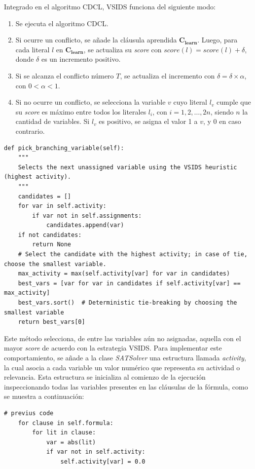 Integrado en el algoritmo CDCL, VSIDS funciona del siguiente modo:

\begin{enumerate}
    \item Se ejecuta el algoritmo CDCL.
    \item Si ocurre un conflicto, se añade la cláusula aprendida \(\mathbf{C_{learn}}\). Luego, para cada literal \( l \) en \(\mathbf{C_{learn}}\), se actualiza su \textit{score} con \(score(l) = score(l) + \delta\), donde \(\delta\) es un incremento positivo.
    \item Si se alcanza el conflicto número \( T \), se actualiza el incremento con \( \delta = \delta \times \alpha \), con \(0 < \alpha < 1\).
    \item Si no ocurre un conflicto, se selecciona la variable \( v \) cuyo literal \( l_v \) cumple que su \textit{score} es máximo entre todos los literales \( l_i \), con \( i = 1, 2, \ldots, 2n \), siendo \( n \) la cantidad de variables. Si \( l_v \) es positivo, se asigna el valor 1 a \( v \), y 0 en caso contrario.
\end{enumerate}

\begin{lstlisting}
def pick_branching_variable(self):
    """
    Selects the next unassigned variable using the VSIDS heuristic (highest activity).
    """
    candidates = []
    for var in self.activity:
        if var not in self.assignments:
            candidates.append(var)
    if not candidates:
        return None
    # Select the candidate with the highest activity; in case of tie, choose the smallest variable.
    max_activity = max(self.activity[var] for var in candidates)
    best_vars = [var for var in candidates if self.activity[var] == max_activity]
    best_vars.sort()  # Deterministic tie-breaking by choosing the smallest variable
    return best_vars[0]
\end{lstlisting}

Este método selecciona, de entre las variables aún no asignadas, aquella con el mayor \textit{score} de acuerdo con la estrategia VSIDS. Para implementar este comportamiento, se añade a la clase \textit{SATSolver} una estructura llamada \textit{activity}, la cual asocia a cada variable un valor numérico que representa su actividad o relevancia. Esta estructura se inicializa al comienzo de la ejecución inspeccionando todas las variables presentes en las cláusulas de la fórmula, como se muestra a continuación:

\begin{lstlisting}
# previus code
    for clause in self.formula:
        for lit in clause:
            var = abs(lit)
            if var not in self.activity:
                self.activity[var] = 0.0
\end{lstlisting}

